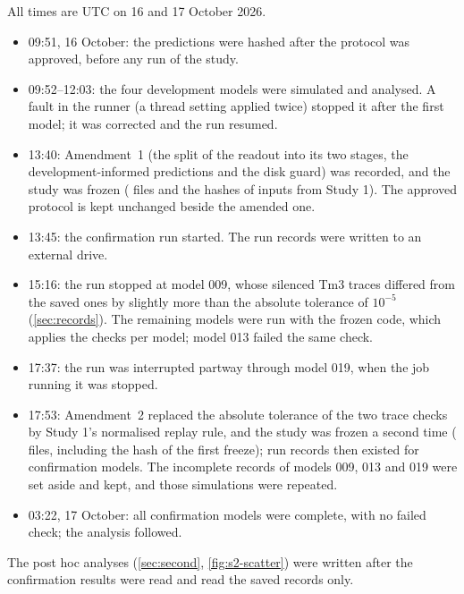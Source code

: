 All times are UTC on 16 and 17 October 2026.
\begin{itemize}
  \item 09:51, 16 October: the predictions were hashed after the protocol was approved, before any run of the study.
  \item 09:52--12:03: the four development models were simulated and analysed. A fault in the runner (a thread setting applied twice) stopped it after the first model; it was corrected and the run resumed.
  \item 13:40: Amendment~1 (the split of the readout into its two stages, the development-informed predictions and the disk guard) was recorded, and the study was frozen (\FreezeFiles{} files and the hashes of \FreezeAISixInputs{} inputs from Study 1). The approved protocol is kept unchanged beside the amended one.
  \item 13:45: the confirmation run started. The run records were written to an external drive.
  \item 15:16: the run stopped at model 009, whose silenced Tm3 traces differed from the saved ones by slightly more than the absolute tolerance of $10^{-5}$ (\cref{sec:records}). The remaining models were run with the frozen code, which applies the checks per model; model 013 failed the same check.
  \item 17:37: the run was interrupted partway through model 019, when the job running it was stopped.
  \item 17:53: Amendment~2 replaced the absolute tolerance of the two trace checks by Study 1's normalised replay rule, and the study was frozen a second time (\FreezeTwoFiles{} files, including the hash of the first freeze); run records then existed for \FreezeTwoRecordModels{} confirmation models. The incomplete records of models 009, 013 and 019 were set aside and kept, and those simulations were repeated.
  \item 03:22, 17 October: all \NConfModels{} confirmation models were complete, with no failed check; the analysis followed.
\end{itemize}
The post hoc analyses (\cref{sec:second}, \cref{fig:s2-scatter}) were written after the confirmation results were read and read the saved records only.
